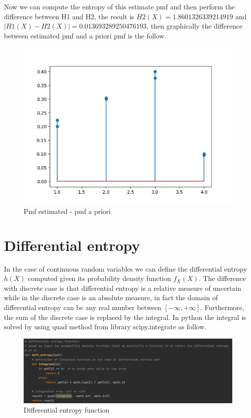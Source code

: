 \documentclass[12pt]{report}
\begin{document}
\newpage
Now we can compute the entropy of this estimate pmf and then perform the difference between H1 and H2, the result is $H2(X) = 1.8601326339214919 $ and $ |H1(X) - H2(X)| = 0.013693289250476193$, then graphically the difference between estimated pmf and a priori pmf is the follow.

\begin{figure}[h!]
    \centering
    \includegraphics[width=13cm]{Pictures/p1-p2.png}
    \caption{Pmf estimated - pmf a priori}
\end{figure}

\section{Differential entropy}
In the case of continuous random variables we can define the differential entropy $h(X)$ computed given its
probability density function $f_{X}(X)$.
The difference with discrete case is that differential entropy is a relative measure of uncertain while in the 
discrete case is an absolute measure, in fact the domain of differential entropy can be any real number between 
$[-\infty,+\infty]$. Furthermore, the sum of the discrete case is replaced by the integral. In python the integral is solved by using quad method from library scipy.integrate as follow.

\begin{figure}[h!]
    \centering
    \includegraphics[width=15cm]{Pictures/Differential entropy fun.png}
    \caption{Differential entropy function}
\end{figure}
\end{document}
